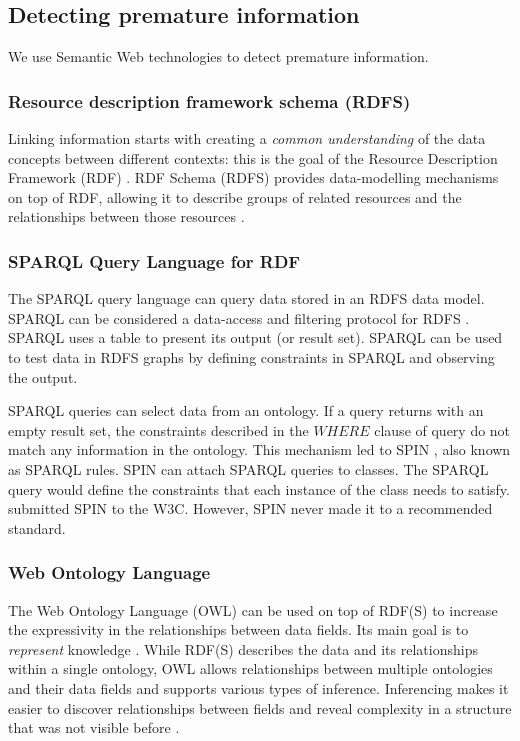 \subsection{Detecting premature information}
We use Semantic Web technologies to detect premature information. 

\subsubsection{Resource description framework schema (RDFS)}
Linking information starts with creating a \emph{common understanding} of the data concepts between different contexts: this is the goal of the Resource Description Framework (RDF) \parencite{SM13}. RDF Schema (RDFS) provides data-modelling mechanisms on top of RDF, allowing it to describe groups of related resources and the relationships between those resources \parencite{WEB06}. 

\subsubsection{SPARQL Query Language for RDF}
The SPARQL query language can query data stored in an RDFS data model. SPARQL can be considered a data-access and filtering protocol for RDFS \parencite{WEB08}. SPARQL uses a table to present its output (or result set). SPARQL can be used to test data in RDFS graphs by defining constraints in SPARQL and observing the output.

SPARQL queries can select data from an ontology. If a query returns with an empty result set, the constraints described in the $WHERE$ clause of query do not match any information in the ontology. This mechanism led to SPIN \parencite{WEB13}, also known as SPARQL rules. SPIN can attach SPARQL queries to classes. The SPARQL query would define the constraints that each instance of the class needs to satisfy. \cite{SM34} submitted SPIN to the W3C. However, SPIN never made it to a recommended standard. 

\subsubsection{Web Ontology Language}
The Web Ontology Language (OWL) can be used on top of RDF(S) to increase the expressivity in the relationships between data fields. Its main goal is to \emph{represent} knowledge \parencite{WEB04}. While RDF(S) describes the data and its relationships within a single ontology, OWL allows relationships between multiple ontologies and their data fields and supports various types of inference. Inferencing makes it easier to discover relationships between fields and reveal complexity in a structure that was not visible before \parencite{SM13}. 

